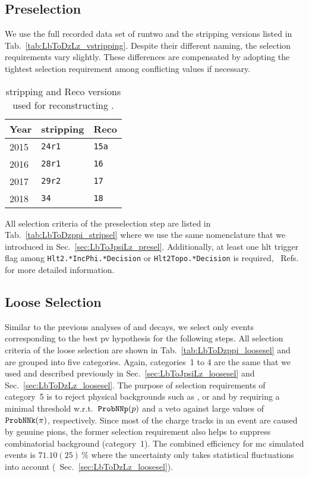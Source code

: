 \subsection{Preselection}
We use the full recorded data set of \gls{runtwo} and the \gls{stripping} versions listed in Tab.~\ref{tab:LbToDzLz_vstripping}.
Despite their different naming, the selection requirements vary slightly.
These differences are compensated by adopting the tightest selection requirement among conflicting values if necessary.

\begin{table}[htbp]
    \centering
    \caption{\Gls{stripping} and Reco versions used for reconstructing \decay{\Lb}{\Dz\proton\pim}.}
    \label{tab:LbToDzppi_vstripping}

    \begin{tabular}{lll}
        \toprule
        Year & \Gls{stripping} & Reco \\
        \midrule
        2015 & \texttt{24r1} & \texttt{15a} \\
        2016 & \texttt{28r1} & \texttt{16} \\
        2017 & \texttt{29r2} & \texttt{17} \\
        2018 & \texttt{34} & \texttt{18} \\
        \bottomrule
    \end{tabular}
\end{table}

All selection criteria of the preselection step are listed in Tab.~\ref{tab:LbToDzppi_stripsel} where we use the same nomenclature that we introduced in Sec.~\ref{sec:LbToJpsiLz_presel}.
Additionally, at least one \gls{hlt} trigger flag among \texttt{Hlt2.*IncPhi.*Decision} or \texttt{Hlt2Topo.*Decision} is required, \cf{}~Refs.~\cite{triggerRun2,HTL2TopoLines} for more detailed information.

\subsection{Loose Selection}
\label{sec:LbToDzppi_loosesel}
Similar to the previous analyses of \decay{\Lb}{\jpsi\Lz} and \decay{\Lb}{\Dz\Lz} decays, we select only events corresponding to the best \gls{pv} hypothesis for the following steps.
All selection criteria of the loose selection are shown in Tab.~\ref{tab:LbToDzppi_loosesel} and are grouped into five categories.
Again, categories~1 to 4 are the same that we used and described previously in Sec.~\ref{sec:LbToJpsiLz_loosesel} and Sec.~\ref{sec:LbToDzLz_loosesel}.
The purpose of selection requirements of category~5 is to reject physical backgrounds such as \decay{\Bd}{\Dzb\pip\pim}, \decay{\Bd}{\Dzb\Km\pip} or \decay{\Bs}{\Dzb\Km\pip} and \decay{\Lb}{\Dz\proton\Km} by requiring a minimal threshold w.r.t.\ $\texttt{ProbNNp}({p})$ and a veto against large values of $\texttt{ProbNNk}({\pi})$, respectively.
Since most of the charge tracks in an event are caused by genuine pions, the former selection requirement also helps to suppress combinatorial background (category~1).
The combined efficiency for \gls{mc} simulated events is $71.10(25)\,\%$ where the uncertainty only takes statistical fluctuations into account (\cf{}~Sec.~\ref{sec:LbToDzLz_loosesel}).

